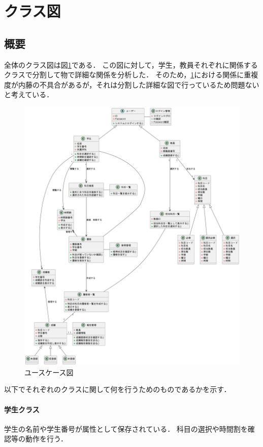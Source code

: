 \documentclass[documentclass]{jsarticle}
\begin{document}
\section{クラス図}
\subsection*{概要}
全体のクラス図は図\ref*{fig:5-1}である．
この図に対して，学生，教員それぞれに関係するクラスで分割して物で詳細な関係を分析した．
そのため，\ref*{fig:5-1}における関係に重複度が内藤の不具合があるが，それは分割した詳細な図で行っているため問題ないと考えている．
\begin{figure}[H]
  \begin{center}
    \includegraphics*[scale=0.3]{figure/5-1.png}
  \end{center}
  \caption{ユースケース図}
  \label{fig:5-1}
\end{figure}

以下でそれぞれのクラスに関して何を行うためのものであるかを示す．

\paragraph*{学生クラス}
学生の名前や学生番号が属性として保存されている．
科目の選択や時間割を確認等の動作を行う．
\end{document}
